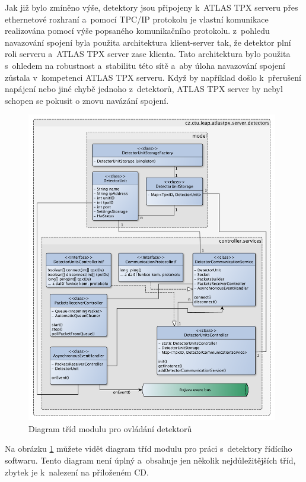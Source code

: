 Jak již bylo zmíněno výše, detektory jsou připojeny k~ATLAS TPX serveru přes ethernetové rozhraní a~pomocí TPC/IP protokolu je vlastní komunikace realizována pomocí výše popsaného komunikačního protokolu. z~pohledu navazování spojení byla použita architektura klient-server tak, že detektor plní roli serveru a~ATLAS TPX server zase klienta. Tato architektura bylo použita s~ohledem na robustnost a~stabilitu této sítě a~aby úloha navazování spojení zůstala v~kompetenci ATLAS TPX serveru. Když by například došlo k~přerušení napájení nebo jiné chybě jednoho z~detektorů, ATLAS TPX server by nebyl schopen se pokusit o znovu navázání spojení.

\begin{figure}[th]
	\begin{center}
		\includegraphics[width=11cm]{figures/atlas_tpx_detectors_class.pdf}
		\caption{Diagram tříd modulu pro ovládání detektorů}
		\label{fig:class:detectors}
	\end{center}
\end{figure}

Na obrázku \ref{fig:class:detectors} můžete vidět diagram tříd modulu pro práci s~detektory řídícího softwaru. Tento diagram není úplný a~obsahuje jen několik nejdůležitějších tříd, zbytek je k~nalezení na přiloženém CD.

